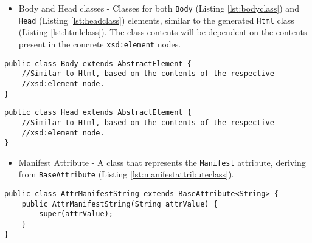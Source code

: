 \begin{itemize}
	\item Body and Head classes - Classes for both \texttt{Body} (Listing \ref{lst:bodyclass}) and \texttt{Head} (Listing \ref{lst:headclass}) elements, similar to the generated \texttt{Html} class (Listing \ref{lst:htmlclass}). The class contents will be dependent on the contents present in the concrete \texttt{xsd:element} nodes.
\end{itemize}

\bigskip

\begin{minipage}{\linewidth}
\begin{lstlisting}[caption={Body Element Class},captionpos=b,label={lst:bodyclass}]
public class Body extends AbstractElement {
    //Similar to Html, based on the contents of the respective
    //xsd:element node.
}
\end{lstlisting}
\end{minipage}

\bigskip

\begin{minipage}{\linewidth}
\begin{lstlisting}[caption={Head Element Class},captionpos=b,label={lst:headclass}]
public class Head extends AbstractElement {
    //Similar to Html, based on the contents of the respective 
    //xsd:element node.
}
\end{lstlisting}
\end{minipage}

\begin{itemize}
	\item Manifest Attribute - A class that represents the \texttt{Manifest} attribute, deriving from \texttt{BaseAttribute} (Listing \ref{lst:manifestattributeclass}).
\end{itemize}

\bigskip


\begin{minipage}{\linewidth}
\begin{lstlisting}[caption={Manifest Attribute Class},captionpos=b,label={lst:manifestattributeclass}]
public class AttrManifestString extends BaseAttribute<String> {
    public AttrManifestString(String attrValue) {
        super(attrValue);
    }
}
\end{lstlisting}
\end{minipage}

